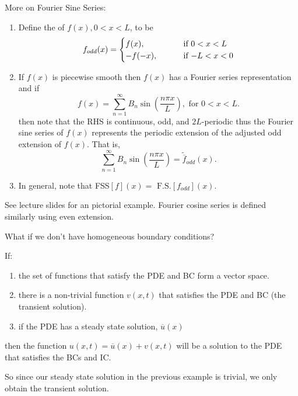\documentclass[class=article,crop=false]{standalone}
\begin{document}
More on Fourier Sine Series:

\begin{defn}[]
\begin{enumerate}[label=\arabic*)]
	\item Define the  of $ f(x), 0<x<L$, to be
 \begin{equation*}
	 f_{odd}(x)=
\begin{cases}
	f(x), \qquad & \text{ if } 0<x<L\\
	-f(-x), \qquad & $ if $ -L<x<0
\end{cases}
\end{equation*}
\item If $ f(x)$ is piecewise smooth then $ f(x)$ has a Fourier series representation and  if
	\[
		f(x)=\sum_{ n= 1}^{\infty} B_n \sin \left( \frac{ n\pi x}{ L} \right) , \text{ for } 0<x<L 
	.\] 
	then note that the RHS is continuous, odd, and $ 2L$-periodic thus the Fourier sine series of  $ f(x)$ represents the periodic extension of the adjusted odd extension of  $ f(x)$. That is,
	 \[
	\sum_{ n= 1}^{\infty} B_n \sin \left( \frac{ n\pi x}{ L} \right) =\tilde{ \overline{f}}_{odd}( x) 
	.\] 
\item In general, note that FSS$[f](x)= \text{ F.S.} [ f_{odd}]( x)  $.
\end{enumerate}
\end{defn}

See lecture slides for an pictorial example. Fourier cosine series is defined similarly using even extension.


What if we don't have homogeneous boundary conditions?

\begin{thm}
If:
\begin{enumerate}[label=\arabic*)]
	\item the set of functions that satisfy the PDE and BC form a vector space.
	\item there is a non-trivial function $ v(x,t)$ that satisfies the PDE and BC (the transient solution).
	\item if the PDE has a steady state solution,  $ \overline{u}(x)$ 
\end{enumerate}
		then the function $ u(x,t)= \overline{u}(x) + v(x,t)$ will be a solution to the PDE that satisfies the BCs and IC.
\end{thm}

So since our steady state solution in the previous example is trivial, we only obtain the transient solution.
\end{document}
